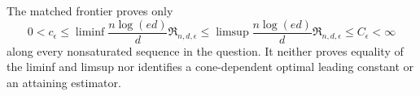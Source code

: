 The matched frontier proves only
\[
 0<c_\epsilon\leq\liminf\frac{n\log(ed)}d\mathfrak R_{n,d,\epsilon}
 \leq\limsup\frac{n\log(ed)}d\mathfrak R_{n,d,\epsilon}\leq C_\epsilon<\infty
\]
along every nonsaturated sequence in the question.  It neither proves equality of the liminf and limsup nor identifies a cone-dependent optimal leading constant or an attaining estimator.